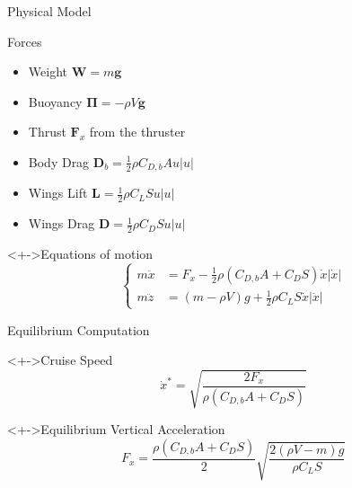 \documentclass[9pt, xcolor={usenames, dvipsnames}]{beamer}
\begin{document}
        \begin{frame}{Physical Model}
            \begin{block}{Forces}
                \begin{itemize}
                    \item Weight $\mathbf{W} = m \mathbf{g}$
                    \item Buoyancy $\boldsymbol{\Pi} = -\rho V \mathbf{g}$
                    \item Thrust $\mathbf{F}_x$ from the thruster
                    \item Body Drag $\mathbf{D}_b = \frac{1}{2} \rho C_{D, b} A \mathbf{}u |\mathbf{}u|$
                    \item Wings Lift $\mathbf{L} = \frac{1}{2} \rho C_L S \mathbf{}u |\mathbf{}u|$
                    \item Wings Drag $\mathbf{D} = \frac{1}{2} \rho C_D S \mathbf{}u |\mathbf{}u|$
                \end{itemize}
            \end{block}
            \begin{block}<+->{Equations of motion}
                \begin{equation}
                    \left\{
                    \begin{aligned}
                        m \ddot x &= F_x - \frac{1}{2} \rho (C_{D, b} A + C_D S) \dot x |\dot x| \\
                        m \ddot z &= (m - \rho V) g + \frac{1}{2} \rho C_L S \dot x |\dot x|
                    \end{aligned}
                    \right.
                \end{equation}
            \end{block}
        \end{frame}

        \begin{frame}{Equilibrium Computation}
            \begin{block}<+->{Cruise Speed}
                \begin{equation}
                    \dot x^* = \sqrt{\frac{2 F_x}{\rho (C_{D, b} A + C_D S)}}
                \end{equation}
            \end{block}
            \begin{block}<+->{Equilibrium Vertical Acceleration}
                \begin{equation}
                    F_x = \frac{\rho (C_{D, b} A + C_D S)}{2} \sqrt{\frac{2 (\rho V - m) g}{\rho C_L S}}
                \end{equation}
            \end{block}
        \end{frame}
\end{document}
